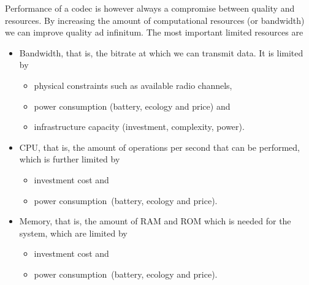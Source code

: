 \documentclass[letterpaper,10pt,english]{jupyterBook}
\begin{document}
\sphinxAtStartPar
Performance of a codec is however always a compromise between quality
and resources. By increasing the amount of computational resources (or
bandwidth) we can improve quality ad infinitum. The most important
limited resources are
\begin{itemize}
\item {} 
\sphinxAtStartPar
Bandwidth, that is, the bit\sphinxhyphen{}rate at which we can transmit data. It
is limited by
\begin{itemize}
\item {} 
\sphinxAtStartPar
physical constraints such as available radio channels,

\item {} 
\sphinxAtStartPar
power consumption (battery, ecology and price) and

\item {} 
\sphinxAtStartPar
infrastructure capacity (investment, complexity, power).

\end{itemize}

\item {} 
\sphinxAtStartPar
CPU, that is, the amount of operations per second that can be
performed, which is further limited by
\begin{itemize}
\item {} 
\sphinxAtStartPar
investment cost and

\item {} 
\sphinxAtStartPar
power consumption (battery, ecology and price).

\end{itemize}

\item {} 
\sphinxAtStartPar
Memory, that is, the amount of RAM and ROM which is needed for the
system, which are limited by
\begin{itemize}
\item {} 
\sphinxAtStartPar
investment cost and

\item {} 
\sphinxAtStartPar
power consumption (battery, ecology and price).

\end{itemize}

\end{itemize}
\end{document}
